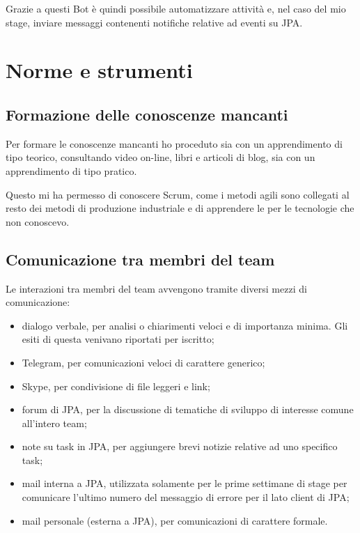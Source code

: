 Grazie a questi Bot è quindi possibile automatizzare attività e, nel caso del
mio stage, inviare messaggi contenenti notifiche relative ad eventi su JPA.

\section{Norme e strumenti}

\subsection{Formazione delle conoscenze mancanti}

Per formare le conoscenze mancanti ho proceduto sia con un apprendimento di
tipo teorico, consultando video on-line, libri e articoli di blog, sia con un
apprendimento di tipo pratico.

Questo mi ha permesso di conoscere Scrum, come i metodi agili sono collegati
al resto dei metodi di produzione industriale e di apprendere le
 per le tecnologie che non conoscevo.

\subsection{Comunicazione tra membri del team}

Le interazioni tra membri del team avvengono tramite diversi mezzi di
comunicazione:

\begin{itemize}
\item dialogo verbale, per analisi o chiarimenti veloci e di importanza minima.
  Gli esiti di questa venivano riportati per iscritto;
\item Telegram, per comunicazioni veloci di carattere generico;
\item Skype, per condivisione di file leggeri e link;
\item forum di JPA, per la discussione di tematiche di sviluppo di interesse
  comune all'intero team;
\item note su task in JPA, per aggiungere brevi notizie relative ad uno
  specifico task;
\item mail interna a JPA, utilizzata solamente per le prime settimane di stage
  per comunicare l'ultimo numero del messaggio di errore per il lato client di
  JPA;
\item mail personale (esterna a JPA), per comunicazioni di carattere formale.
\end{itemize}

